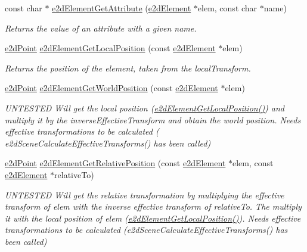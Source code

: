 \begin{DoxyCompactItemize}
const char $\ast$ \hyperlink{group__e2dElement_gac32ea8a33b317fc014929102d64ac157}{e2d\-Element\-Get\-Attribute} (\hyperlink{structe2dElement}{e2d\-Element} $\ast$elem, const char $\ast$name)
\begin{DoxyCompactList}\small\item\em Returns the value of an attribute with a given name. \end{DoxyCompactList}\item 
\hyperlink{structe2dPoint}{e2d\-Point} \hyperlink{group__e2dElement_ga39dd883e42f609efba3f75300a29ff31}{e2d\-Element\-Get\-Local\-Position} (const \hyperlink{structe2dElement}{e2d\-Element} $\ast$elem)
\begin{DoxyCompactList}\small\item\em Returns the position of the element, taken from the local\-Transform. \end{DoxyCompactList}\item 
\hyperlink{structe2dPoint}{e2d\-Point} \hyperlink{group__e2dElement_ga9b85de42e52c0d89e82f9231ea923c8c}{e2d\-Element\-Get\-World\-Position} (const \hyperlink{structe2dElement}{e2d\-Element} $\ast$elem)
\begin{DoxyCompactList}\small\item\em U\-N\-T\-E\-S\-T\-E\-D Will get the local position (\hyperlink{group__e2dElement_ga39dd883e42f609efba3f75300a29ff31}{e2d\-Element\-Get\-Local\-Position()}) and multiply it by the inverse\-Effective\-Transform and obtain the world position. Needs effective transformations to be calculated ( e2d\-Scene\-Calculate\-Effective\-Transforms() has been called) \end{DoxyCompactList}\item 
\hyperlink{structe2dPoint}{e2d\-Point} \hyperlink{group__e2dElement_gab4e3f4eeba31c937a946f68617c5cb06}{e2d\-Element\-Get\-Relative\-Position} (const \hyperlink{structe2dElement}{e2d\-Element} $\ast$elem, const \hyperlink{structe2dElement}{e2d\-Element} $\ast$relative\-To)
\begin{DoxyCompactList}\small\item\em U\-N\-T\-E\-S\-T\-E\-D Will get the relative transformation by multiplying the effective transform of elem with the inverse effective transform of relative\-To. The multiply it with the local position of elem (\hyperlink{group__e2dElement_ga39dd883e42f609efba3f75300a29ff31}{e2d\-Element\-Get\-Local\-Position()}). Needs effective transformations to be calculated (e2d\-Scene\-Calculate\-Effective\-Transforms() has been called) \end{DoxyCompactList}\item 

\end{DoxyCompactItemize}
